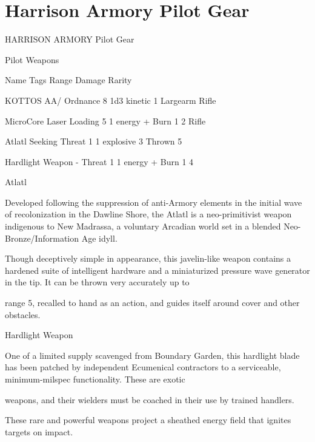 \section{Harrison Armory Pilot Gear}

                                  HARRISON ARMORY Pilot Gear  

                                                    Pilot Weapons  

  Name                    Tags                                      Range            Damage                  Rarity 

 KOTTOS AA/               Ordnance                                  8                1d3 kinetic             1 
 Largearm Rifle 

 MicroCore Laser          Loading                                  5                 1 energy + Burn 1       2 
 Rifle 

 Atlatl                   Seeking                                  Threat 1
         1 explosive             3 
                                                                   Thrown 5 

 Hardlight Weapon         -                                        Threat 1          1 energy + Burn 1       4 

Atlatl  

Developed following the suppression of anti-Armory elements in the initial wave of recolonization in the  
Dawline Shore, the Atlatl is a neo-primitivist weapon indigenous to New Madrassa, a voluntary Arcadian  
world set in a blended Neo-Bronze/Information Age idyll.   

Though deceptively simple in appearance, this javelin-like weapon contains a hardened suite of intelligent  
hardware and a miniaturized pressure wave generator in the tip. It can be thrown very accurately up to  

range 5, recalled to hand as an action, and guides itself around cover and other obstacles.
 

Hardlight Weapon  

One of a limited supply scavenged from Boundary Garden, this hardlight blade has been patched by  
independent Ecumenical contractors to a serviceable, minimum-milspec functionality. These are exotic  

weapons, and their wielders must be coached in their use by trained handlers.    

These rare and powerful weapons project a sheathed energy field that ignites targets on impact.
 

